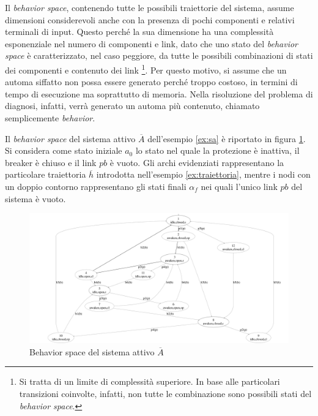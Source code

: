 Il \emph{behavior space}, contenendo tutte le possibili traiettorie del sistema, assume dimensioni considerevoli anche con la presenza di pochi componenti e relativi terminali di input. Questo perché la sua dimensione ha una complessità esponenziale nel numero di componenti e link, dato che uno stato del \emph{behavior space} è caratterizzato, nel caso peggiore, da tutte le possibili combinazioni di stati dei componenti e contenuto dei link \footnote{Si tratta di un limite di complessità superiore. In base alle particolari transizioni coinvolte, infatti, non tutte le combinazione sono possibili stati del \emph{behavior space}.}. Per questo motivo, si assume che un automa siffatto non possa essere generato perché troppo costoso, in termini di tempo di esecuzione ma soprattutto di memoria. Nella risoluzione del problema di diagnosi, infatti, verrà generato un automa più contenuto, chiamato semplicemente \emph{behavior}.

\begin{ex}
Il \emph{behavior space} del sistema attivo $\overline{A}$ dell'esempio \ref{ex:sa} è riportato in figura \ref{fig:bsp}. Si considera come stato iniziale $a_0$ lo stato nel quale la protezione è inattiva, il breaker è chiuso e il link $pb$ è vuoto. Gli archi evidenziati rappresentano la particolare traiettoria $\overline{h}$ introdotta nell'esempio \ref{ex:traiettoria}, mentre i nodi con un doppio contorno rappresentano gli stati finali $\alpha_f$ nei quali l'unico link $pb$ del sistema è vuoto.
\end{ex}

\begin{figure}[htbp]
\centering
\includegraphics[scale=0.07]{./Img/sa/behavior_space.png}
\caption{Behavior space del sistema attivo $\overline{A}$}
\label{fig:bsp}
\end{figure}

\newpage
